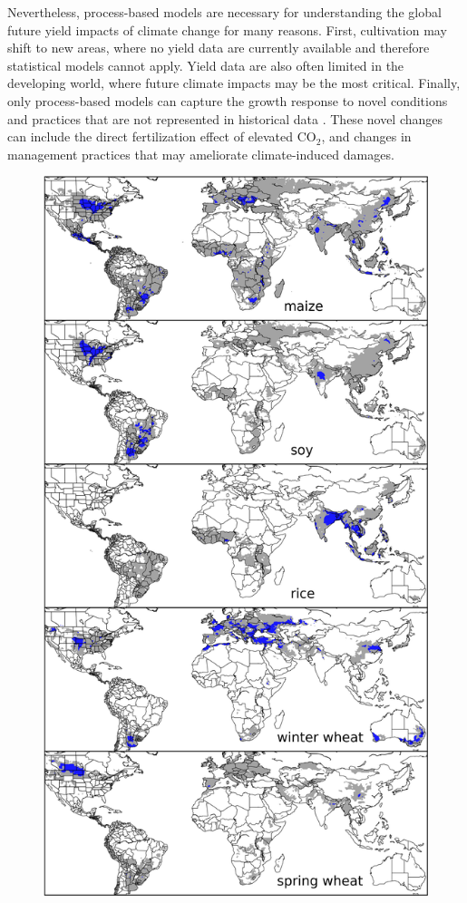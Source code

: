 \documentclass[preprint, 5p, times, twocolumn]{elsarticle}
\begin{document}
Nevertheless, process-based models are necessary for understanding the global future yield impacts of climate change for many reasons. First, cultivation may shift to new areas, where no yield data are currently available and therefore statistical models cannot apply. Yield data are also often limited in the developing world, where future climate impacts may be the most critical. Finally, only process-based models can capture the growth response to novel conditions and practices that are not represented in historical data \citep[e.g.][]{pugh_climate_2016, Roberts2017}. These novel changes can include the direct fertilization effect of elevated CO$_2$, and changes in management practices that may ameliorate climate-induced damages.

\begin{figure}[!ht]
\centering
   \includegraphics[width=0.95\linewidth]{figures/croparea.png}

\end{figure}
\end{document}
